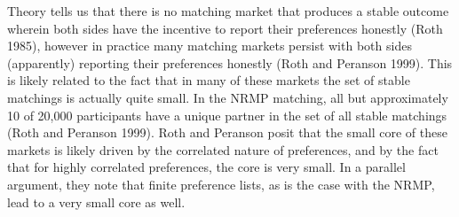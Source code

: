 \documentclass[WP]{AEA}
\begin{document}

Theory tells us that there is no matching market that produces a stable outcome wherein both sides have the incentive to report their preferences honestly (Roth 1985), however in practice many matching markets persist with both sides (apparently) reporting their preferences honestly  (Roth and Peranson 1999).  This is likely related to the fact that in many of these markets the set of stable matchings is actually quite small.  In the NRMP matching, all but approximately 10 of 20,000 participants have a unique partner in the set of all stable matchings (Roth and Peranson 1999).  Roth and Peranson posit that the small core of these markets is likely driven by the correlated nature of preferences, and by the fact that for highly correlated preferences, the core is very small.  In a parallel argument,  they note that finite preference lists, as is the case with the NRMP, lead to a very small core as well.  
\end{document}
